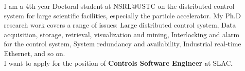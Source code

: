 

I am a 4th-year Doctoral student at NSRL@USTC on the distributed control system for large scientific facilities, especially the particle accelerator. My Ph.D research work covers a range of issues: Large distributed control system, Data acquisition, storage, retrieval,  visualization and mining, Interlocking and alarm for the control system, System redundancy and availability, Industrial real-time Ethernet, and so on. \\
I want to apply for the position of \textbf{Controls Software Engineer} at SLAC.


